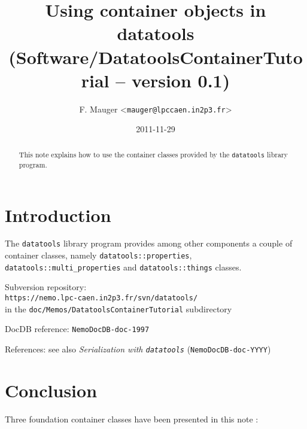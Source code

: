 \documentclass[a4paper,12pt]{article}
\title{Using container objects in datatools\\%
{\small{(Software/DatatoolsContainerTutorial -- version 0.1)}}}
\author{F. Mauger <\texttt{mauger@lpccaen.in2p3.fr}>}
\date{2011-11-29}
\newcommand{\pn}{\par\noindent}
\begin{document}
\maketitle

\begin{abstract}
This note  explains how to use  the container classes  provided by the
\texttt{datatools} library program.
\end{abstract}

\tableofcontents

\section{Introduction}

\pn  The  \texttt{datatools}  library  program  provides  among  other
components     a    couple     of     container    classes,     namely
\texttt{datatools::properties},   \texttt{datatools::multi\_properties}
and \texttt{datatools::things} classes.

\vskip 5mm
\pn
Subversion repository:\\
\texttt{https://nemo.lpc-caen.in2p3.fr/svn/datatools/} \\
in the \texttt{doc/Memos/DatatoolsContainerTutorial} subdirectory
\pn
DocDB reference: \texttt{NemoDocDB-doc-1997}
\pn
References: see also \textit{Serialization with \texttt{datatools}} 
(\texttt{NemoDocDB-doc-YYYY})

\clearpage


\clearpage


\clearpage


\clearpage

\section{Conclusion}

\pn  Three foundation container  classes have  been presented  in this
note :
\end{document}
